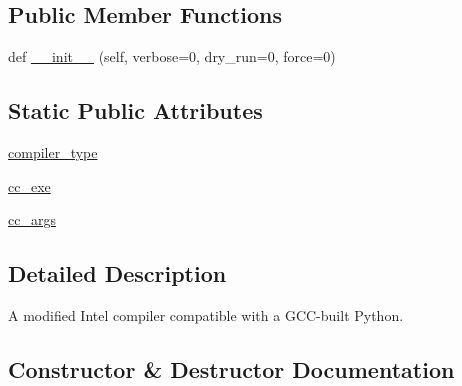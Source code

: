 \subsection*{Public Member Functions}
\begin{DoxyCompactItemize}
\item 
def \hyperlink{classnumpy_1_1distutils_1_1intelccompiler_1_1IntelCCompiler_a9e087acf54ea6321120355f8ac6a7b08}{\+\_\+\+\_\+init\+\_\+\+\_\+} (self, verbose=0, dry\+\_\+run=0, force=0)
\end{DoxyCompactItemize}
\subsection*{Static Public Attributes}
\begin{DoxyCompactItemize}
\item 
\hyperlink{classnumpy_1_1distutils_1_1intelccompiler_1_1IntelCCompiler_ac13dd56d3fb1ce76891342119a15b71e}{compiler\+\_\+type}
\item 
\hyperlink{classnumpy_1_1distutils_1_1intelccompiler_1_1IntelCCompiler_a94794ee21c24a2ad75467316616e82e5}{cc\+\_\+exe}
\item 
\hyperlink{classnumpy_1_1distutils_1_1intelccompiler_1_1IntelCCompiler_a82bea63b305169a6d07d6c22bc0b7d7d}{cc\+\_\+args}
\end{DoxyCompactItemize}


\subsection{Detailed Description}
\begin{DoxyVerb}A modified Intel compiler compatible with a GCC-built Python.\end{DoxyVerb}
 

\subsection{Constructor \& Destructor Documentation}
\mbox{\label{classnumpy_1_1distutils_1_1intelccompiler_1_1IntelCCompiler_a9e087acf54ea6321120355f8ac6a7b08}} 
